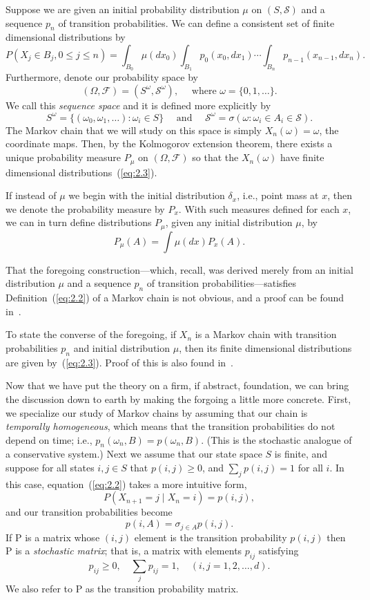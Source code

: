 \documentclass[12pt,letterpaper]{report}
\theoremstyle{plain}
\theoremstyle{definition}
\theoremstyle{remark}
\numberwithin{theorem}{chapter}
\numberwithin{claim}{chapter}
\numberwithin{equation}{chapter}
\numberwithin{conjecture}{chapter}
\renewcommand\S{\ensuremath{\mathcal{S}}}
\newcommand\F{\ensuremath{\mathcal{F}}}
\renewcommand\P{\ensuremath{\mathrm{P}}}
\newcommand\pij{\ensuremath{p_{ij}}}
\newcommand\<{\ensuremath{\langle}}
\renewcommand\>{\ensuremath{\rangle}}
\begin{document}
Suppose we are given an initial probability distribution $\mu$ on $(S, \S)$ and a sequence $p_n$ of
transition probabilities. We can define a consistent set of finite dimensional distributions by
\begin{equation}
\label{eq:2.3}
P(X_j\in B_j ,0 \leq j \leq n) = \int_{B_0} \mu(dx_0) \int_{B_1} p_0(x_0, dx_1) 
\cdots 
\int_{B_n} p_{n-1}(x_{n-1}, dx_n).
\end{equation}
Furthermore, denote our probability space by
\[
(\Omega, \F) = (S^\omega,\S^\omega), \quad \text{ where } \omega = \{0,1,\dots\}.
\]
We call this \emph{sequence space} and it is defined more explicitly by
\[
S^\omega  = \{(\omega_0, \omega_1, \dots) : \omega_i \in S\}\quad \text{ and }
\quad
\S^\omega  = \sigma(\omega : \omega_i \in A_i \in \S).
\]
The Markov chain that we will study on this space is simply $X_n(\omega) = \omega$, the coordinate maps.
Then, by the Kolmogorov extension theorem, there exists a unique probability measure $P_\mu$ on
$(\Omega, \F)$ so that the $X_n(\omega)$ have finite dimensional distributions~(\ref{eq:2.3}).

If instead of $\mu$ we begin with the initial distribution $\delta_x$, i.e., point mass at $x$, then we
denote the probability measure by $P_x$. With such measures defined for each $x$, we can in turn
define distributions $P_\mu$, given any initial distribution $\mu$, by
\[
P_\mu(A) = \int \mu(dx)P_x(A).
\]

That the foregoing construction---which, recall, was derived merely from an
initial distribution $\mu$ and a sequence $p_n$ of transition
probabilities---satisfies Definition~(\ref{eq:2.2}) of a Markov chain is not
obvious, and a proof can be found in~\cite{Durret:1996}.

To state the converse of the foregoing, if $X_n$ is a Markov chain with
transition probabilities $p_n$ and initial distribution $\mu$, then its finite
dimensional distributions are given by~(\ref{eq:2.3}). Proof of this is also found
in~\cite{Durret:1996}. 

Now that we have put the theory on a firm, if abstract, foundation, we can bring
the discussion down to earth by making the forgoing a little more
concrete. First, we specialize our study of Markov chains by assuming that our
chain is \emph{temporally homogeneous}, which means that the transition
probabilities do not depend on time; i.e., 
$p_n(\omega_n, B) = p(\omega_n, B)$. (This is the stochastic analogue of a
conservative system.) 
Next we assume that our state space $S$ is finite, and suppose for all states
$i,j \in S$ that $p(i, j) \geq 0$, and $\sum_j p(i, j) = 1$ for all $i$. In
this case, equation~(\ref{eq:2.2}) takes a more intuitive form,
\[
P(X_{n+1}=j \mid X_n = i) =p(i,j),
\]
and our transition probabilities become
\[
p(i,A) = \sigma_{j\in A} p(i,j).
\]
If $\P$ is a matrix whose $(i, j)$ element is the transition probability 
$p(i, j)$ then P is a \emph{stochastic matrix}; that is, a matrix with elements
$p_{ij}$ satisfying 
\[
\pij \geq 0, \quad \sum_j \pij =1, \quad (i, j =1, 2, \dots, d).
\]
We also refer to $\P$ as the transition probability matrix.
\end{document}
